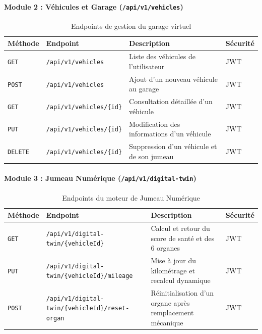 \documentclass[12pt,a4paper,oneside]{report}
\begin{document}
\paragraph{Module 2 : V\'ehicules et Garage (\texttt{/api/v1/vehicles})}
\begin{table}[H]
\centering
\small
\begin{tabularx}{\textwidth}{p{1.4cm} p{4.8cm} X p{2cm}}
\toprule
\textbf{M\'ethode} & \textbf{Endpoint} & \textbf{Description} & \textbf{S\'ecurit\'e} \\
\midrule
\texttt{GET} & \texttt{/api/v1/vehicles} & Liste des v\'ehicules de l'utilisateur & JWT \\
\texttt{POST} & \texttt{/api/v1/vehicles} & Ajout d'un nouveau v\'ehicule au garage & JWT \\
\texttt{GET} & \texttt{/api/v1/vehicles/\{id\}} & Consultation d\'etaill\'ee d'un v\'ehicule & JWT \\
\texttt{PUT} & \texttt{/api/v1/vehicles/\{id\}} & Modification des informations d'un v\'ehicule & JWT \\
\texttt{DELETE} & \texttt{/api/v1/vehicles/\{id\}} & Suppression d'un v\'ehicule et de son jumeau & JWT \\
\bottomrule
\end{tabularx}
\caption{Endpoints de gestion du garage virtuel}
\end{table}

\paragraph{Module 3 : Jumeau Num\'erique (\texttt{/api/v1/digital-twin})}
\begin{table}[H]
\centering
\small
\begin{tabularx}{\textwidth}{p{1.4cm} p{5.5cm} X p{1.6cm}}
\toprule
\textbf{M\'ethode} & \textbf{Endpoint} & \textbf{Description} & \textbf{S\'ecurit\'e} \\
\midrule
\texttt{GET} & \texttt{/api/v1/digital-twin/\{vehicleId\}} & Calcul et retour du score de sant\'e et des 6 organes & JWT \\
\texttt{PUT} & \texttt{/api/v1/digital-twin/\{vehicleId\}/mileage} & Mise \`a jour du kilom\'etrage et recalcul dynamique & JWT \\
\texttt{POST} & \texttt{/api/v1/digital-twin/\{vehicleId\}/reset-organ} & R\'einitialisation d'un organe apr\`es remplacement m\'ecanique & JWT \\
\bottomrule
\end{tabularx}
\caption{Endpoints du moteur de Jumeau Num\'erique}
\end{table}
\end{document}
